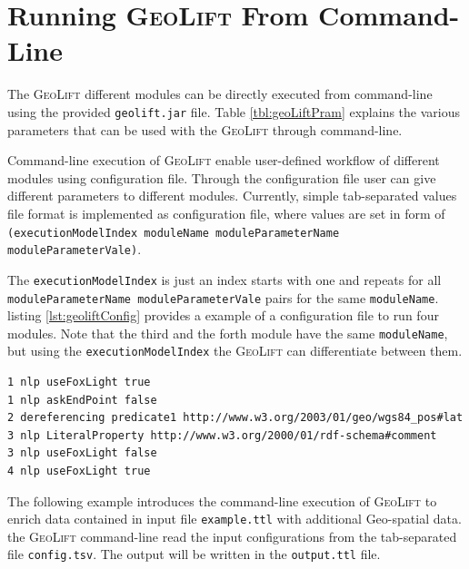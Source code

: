 \documentclass[a4paper,twoside,bibtotoc,abstracton,12pt,BCOR=15mm]{article}
\newcommand{\geolift}{\textsc{GeoLift}\xspace}
\begin{document}

\section{Running \geolift From Command-Line }

The \geolift different modules can be directly executed from command-line using the provided \texttt{geolift.jar} file.
Table \ref{tbl:geoLiftPram} explains the various parameters that can be used with the \geolift through command-line. 

Command-line execution of \geolift enable user-defined workflow of different modules using configuration file.
Through the configuration file user can give different parameters to different modules.
Currently, simple tab-separated values file format is implemented as configuration file, 
where values are set in form of \texttt{(executionModelIndex moduleName moduleParameterName moduleParameterVale)}.

The \texttt{executionModelIndex} is just an index starts with one and repeats for all \texttt{moduleParameterName moduleParameterVale} pairs for the same \texttt{moduleName}.
listing \ref{lst:geoliftConfig} provides a example of a configuration file to run four modules.
Note that the third and the forth module have the same \texttt{moduleName}, but using the \texttt{executionModelIndex} the \geolift can differentiate between them.

\newpage

\begin{lstlisting}[label=lst:geoliftConfig, caption =\geolift configuration file example class.]
1 nlp useFoxLight true
1 nlp askEndPoint false
2 dereferencing predicate1 http://www.w3.org/2003/01/geo/wgs84_pos#lat
3 nlp LiteralProperty http://www.w3.org/2000/01/rdf-schema#comment
3 nlp useFoxLight false
4 nlp useFoxLight true
\end{lstlisting}

The following example introduces the command-line execution of \geolift to enrich data contained in input file \texttt{example.ttl} with additional Geo-spatial data.
the \geolift command-line read the input configurations from the tab-separated file \texttt{config.tsv}.
The output will be written in the \texttt{output.ttl} file.
\end{document}
